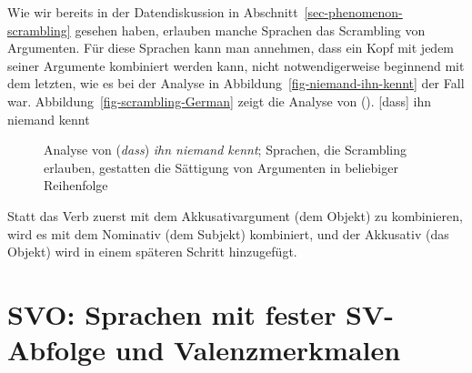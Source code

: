 Wie wir bereits in der Datendiskussion in Abschnitt~\ref{sec-phenomenon-scrambling} gesehen haben, erlauben manche Sprachen
das Scrambling von Argumenten. Für diese Sprachen kann man annehmen, dass ein Kopf mit jedem seiner
Argumente kombiniert werden kann, nicht notwendigerweise beginnend mit dem letzten, wie es bei der Analyse in Abbildung~\ref{fig-niemand-ihn-kennt} der Fall war.
Abbildung~\vref{fig-scrambling-German} zeigt die Analyse von ().
\ea
{}[dass] ihn niemand kennt
\z
\begin{figure}
\caption{\label{fig-scrambling-German}Analyse von (\emph{dass}) \emph{ihn niemand kennt};
  Sprachen, die Scrambling erlauben, gestatten die Sättigung von Argumenten in beliebiger Reihenfolge}
\end{figure}
Statt das Verb zuerst mit dem Akkusativargument (dem Objekt) zu kombinieren, wird es mit dem
Nominativ (dem Subjekt) kombiniert, und der Akkusativ (das Objekt) wird in einem späteren Schritt hinzugefügt.%


\section{SVO: Sprachen mit fester SV-Abfolge und Valenzmerkmalen}
\label{sec-intro-schemata}
\label{sec-intro-spr-comps}

